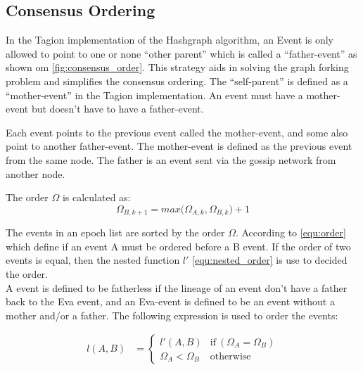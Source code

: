 \subsection{Consensus Ordering}\label{sec:consensus_ordering}
In the Tagion implementation of the Hashgraph algorithm, an Event is only allowed to point to one or none ``other parent'' which is called a ``father-event'' as shown om \cref{fig:consensus_order}. This strategy aids in solving the graph forking problem and simplifies the consensus ordering.
The ``self-parent'' is defined as a ``mother-event'' in the Tagion implementation. An event must have a mother-event but doesn't have to have a father-event.

Each event points to the previous event called the mother-event, and some also point to another father-event. The mother-event is defined as the previous event from the same node. The father is an event sent via the gossip network from another node. 

The order $\Omega$ is calculated as:
\begin{equation}
 \Omega_{B,k+1} = max \big(\Omega_{A,k} , \Omega_{B,k} \big) +1
\end{equation}

The events in an epoch list are sorted by the order $\Omega$. According to \cref{equ:order} which define if an event A must be ordered before a B event. If the order of two events is equal, then the nested function $l'$ \cref{equ:nested_order} is use to decided the order.\\
A event is defined to be fatherless if the lineage of an event don't have a father back to the Eva event, and an Eva-event is defined to be an event without a mother and/or a father.
The following expression is used to order the events:

\begin{align}
 {l}(A,B) & = 
    \begin{cases}
         {l'}(A,B) &  	\text{if}  ~ ({\Omega}_{A} = {\Omega}_{B} )  \\ 
        {{\Omega}_{A} < {\Omega}_{B}} & 
        \text{otherwise}
    \end{cases} 
    \label{equ:order}    
\end{align}

